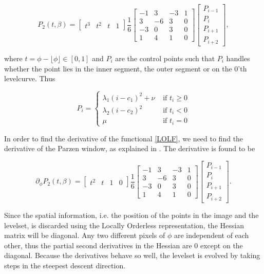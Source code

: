 \begin{equation}
  P_2(t,\beta) = 
  \begin{bmatrix} t^3 & t^2 & t & 1 \end{bmatrix} 
  \frac{1}{6} 
  \begin{bmatrix}
    -1 &  3 & -3 & 1 \\
    3 & -6 &  3 & 0 \\
    -3 &  0 &  3 & 0 \\
    1 &  4 &  1 & 0 
  \end{bmatrix}
  \left[\begin{array}{l} 
      P_{i-1} \\
      P_{i} \\
      P_{i+1} \\
      P_{i+2}
    \end{array}\right],
\end{equation}

where $t = \phi-\lfloor \phi\rfloor \in [0,1]$ and $P_i$ are the control points such that $P_i$ handles whether the point lies in the inner segment, the outer segment or on the 0'th levelcurve. Thus

\begin{equation}
  P_i = 
  \begin{cases}
    \lambda_1(i-c_1)^2 + \nu & \mbox{ if } t_i \geq 0\\
    \lambda_2(i-c_2)^2 & \mbox{ if } t_i < 0\\
    \mu & \mbox{ if } t_i = 0
  \end{cases}
\end{equation}

In order to find the derivative of the functional \eqref{LOLF}, we need to find the derivative of the Parzen window, as explained in . The derivative is found to be

\begin{equation}
\partial_\phi  P_2(t,\beta) = 
  \begin{bmatrix} t^2 & t & 1 & 0 \end{bmatrix} 
  \frac{1}{6} 
  \begin{bmatrix}
    -1 &  3 & -3 & 1 \\
    3 & -6 &  3 & 0 \\
    -3 &  0 &  3 & 0 \\
    1 &  4 &  1 & 0 
  \end{bmatrix}
  \left[\begin{array}{l} 
      P_{i-1} \\
      P_{i} \\
      P_{i+1} \\
      P_{i+2}
    \end{array}\right].
\end{equation}

Since the spatial information, i.e. the position of the points in the image and the levelset, is discarded using the Locally Orderless representation, the Hessian matrix will be diagonal. Any two different pixels of $\phi$ are independent of each other, thus the partial second derivatives in the Hessian are 0 except on the diagonal. Because the derivatives behave so well, the levelset is evolved by taking steps in the steepest descent direction.